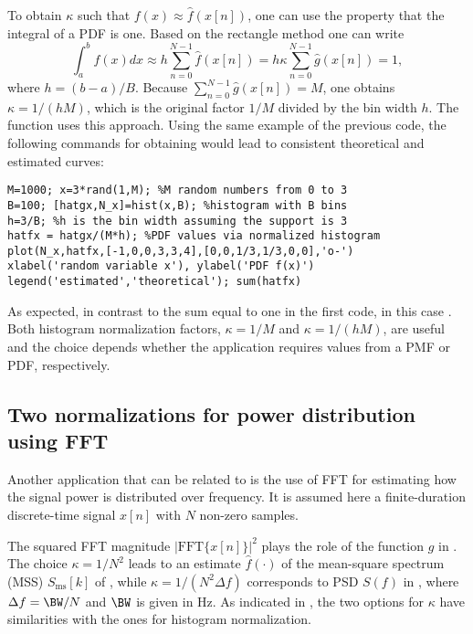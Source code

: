 To obtain $\kappa$ such that $f(x) \approx \hat f(x[n])$, one can use the property that the integral of a PDF is one. Based on the rectangle method one can write
\[
\int_a^b f(x) dx \approx h \sum_{n=0}^{N-1} \hat f(x[n]) = h \kappa \sum_{n=0}^{N-1} \hat g(x[n]) = 1,
\]
where $h=(b-a)/B$. Because $\sum_{n=0}^{N-1} \hat g(x[n])=M$, one obtains $\kappa = 1/(hM)$, which is the original factor $1/M$ divided by the bin width $h$.
The function  uses this approach. Using the same example of the previous code, the following commands for obtaining  would lead to consistent theoretical and estimated curves:
\begin{lstlisting}
M=1000; x=3*rand(1,M); %M random numbers from 0 to 3
B=100; [hatgx,N_x]=hist(x,B); %histogram with B bins
h=3/B; %h is the bin width assuming the support is 3
hatfx = hatgx/(M*h); %PDF values via normalized histogram
plot(N_x,hatfx,[-1,0,0,3,3,4],[0,0,1/3,1/3,0,0],'o-')
xlabel('random variable x'), ylabel('PDF f(x)')
legend('estimated','theoretical'); sum(hatfx)
\end{lstlisting}
As expected, in contrast to the sum equal to one in the first code, in this case . Both histogram normalization factors, $\kappa=1/M$ and $\kappa=1/(hM)$, are useful and the choice depends whether the application requires values from a PMF or PDF, respectively.

\subsection{Two normalizations for power distribution using FFT}

Another application that can be related to  is the use of FFT for estimating how the signal 
power is distributed over frequency.
It is assumed here a finite-duration discrete-time signal $x[n]$ with $N$ non-zero samples.

The squared FFT magnitude $|\textrm{FFT}\{x[n]\}|^2$
plays the role of the function $\hat g$ in . The choice $\kappa=1/N^2$ leads to an estimate $\hat f(\cdot)$ of the mean-square spectrum (MSS) $S_{\textrm{ms}}[k]$ of , while $\kappa=1/(N^2 \Delta f)$ corresponds to PSD $S(f)$ in , where $\Delta f = \BW/N$ and $\BW$ is given in Hz. As indicated in , the two options for $\kappa$ have similarities with the ones for histogram normalization.

